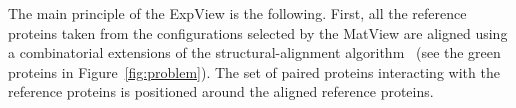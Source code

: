 \documentclass{bmcart}
\begin{document}

The main principle of the ExpView is the following.
First, all the reference proteins taken from the configurations selected by the MatView are aligned using a combinatorial extensions of the structural-alignment algorithm~\cite{Shindyalov1998} (see the green proteins in Figure~\ref{fig:problem}).
The set of paired proteins interacting with the reference proteins is positioned around the aligned reference proteins.
\end{document}
